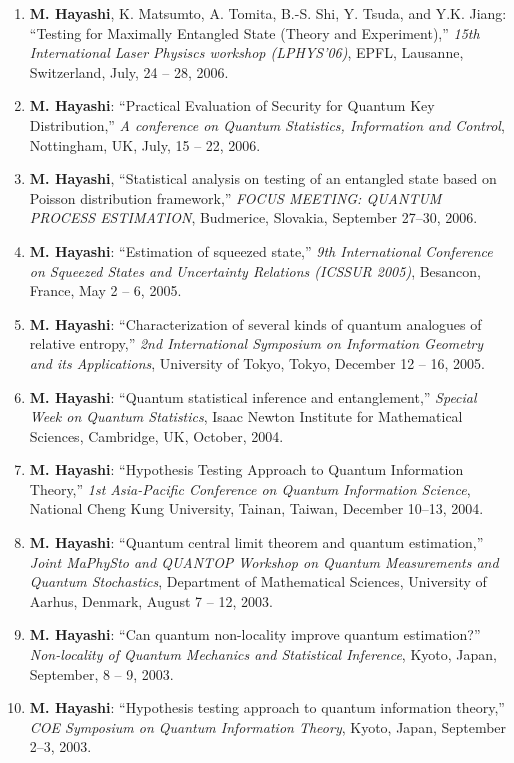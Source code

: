 \documentclass[a4paper,12pt,oneside]{article}
\begin{document}
\begin{enumerate}
\item
\textbf{M. Hayashi}, K. Matsumto, A. Tomita, B.-S. Shi, Y. Tsuda, and Y.K. Jiang: ``Testing for Maximally Entangled State (Theory and Experiment),'' 
{\em 15th International Laser Physiscs workshop (LPHYS'06)}, EPFL, Lausanne, Switzerland, 
July, 24 -- 28, 2006.

\item
\textbf{M. Hayashi}: ``Practical Evaluation of Security for Quantum Key Distribution,'' 
{\em A conference on Quantum Statistics, Information and Control}, Nottingham, UK, July, 15 -- 22, 2006.

\item
\textbf{M. Hayashi}, ``Statistical analysis on testing of an entangled state based on Poisson distribution framework,'' 
{\em FOCUS MEETING: QUANTUM PROCESS ESTIMATION}, 
Budmerice, Slovakia, September 27--30, 2006.

\item
\textbf{M. Hayashi}: ``Estimation of squeezed state,'' 
{\em 9th International Conference on Squeezed States and Uncertainty Relations (ICSSUR 2005)}, Besancon, France, May 2 -- 6,  2005.

\item
\textbf{M. Hayashi}: ``Characterization of several kinds of quantum analogues of relative entropy,'' 
{\em 2nd International Symposium on Information Geometry and its Applications}, 
University of Tokyo, Tokyo, December 12 -- 16,  2005.

\item
\textbf{M. Hayashi}: ``Quantum statistical inference and entanglement,'' 
{\em Special Week on Quantum Statistics}, Isaac Newton Institute for Mathematical Sciences, Cambridge, UK, October, 2004.

\item
\textbf{M. Hayashi}: ``Hypothesis Testing Approach to Quantum Information Theory,'' 
{\em 1st Asia-Pacific Conference on Quantum Information Science}, 
National Cheng Kung University, Tainan, Taiwan,
December 10--13, 2004.


\item
\textbf{M. Hayashi}: ``Quantum central limit theorem and quantum estimation,'' 
{\em Joint MaPhySto and QUANTOP Workshop on Quantum Measurements and Quantum Stochastics}, 
Department of Mathematical Sciences, University of Aarhus, Denmark, August 7 -- 12, 2003.

\item
\textbf{M. Hayashi}: ``Can quantum non-locality improve quantum estimation?'' 
{\em Non-locality of Quantum Mechanics and Statistical Inference}, Kyoto, 
Japan, September, 8 -- 9, 2003.

\item
\textbf{M. Hayashi}: ``Hypothesis testing approach to quantum information theory,'' 
{\em COE Symposium on Quantum Information Theory}, Kyoto, Japan, September 2--3, 2003.
\end{enumerate}
\end{document}
